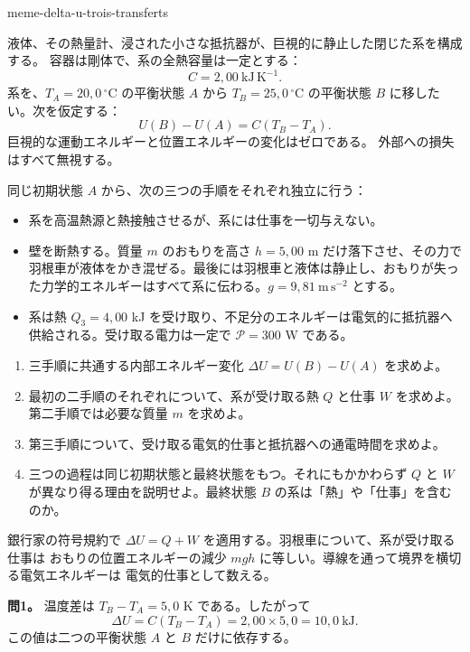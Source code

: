 \begin{exo}{meme-delta-u-trois-transferts}

液体、その熱量計、浸された小さな抵抗器が、巨視的に静止した閉じた系を構成する。
容器は剛体で、系の全熱容量は一定とする：
\[
C=2{,}00\ \mathrm{kJ\,K^{-1}}.
\]
系を、$T_A=20{,}0\,^\circ\mathrm{C}$ の平衡状態 $A$ から
$T_B=25{,}0\,^\circ\mathrm{C}$ の平衡状態 $B$ に移したい。次を仮定する：
\[
U(B)-U(A)=C(T_B-T_A).
\]
巨視的な運動エネルギーと位置エネルギーの変化はゼロである。
外部への損失はすべて無視する。

同じ初期状態 $A$ から、次の三つの手順をそれぞれ独立に行う：
\begin{itemize}
\item[手順1] 系を高温熱源と熱接触させるが、系には仕事を一切与えない。
\item[手順2] 壁を断熱する。質量 $m$ のおもりを高さ $h=5{,}00$ m だけ落下させ、その力で羽根車が液体をかき混ぜる。最後には羽根車と液体は静止し、おもりが失った力学的エネルギーはすべて系に伝わる。$g=9{,}81\ \mathrm{m\,s^{-2}}$ とする。
\item[手順3] 系は熱 $Q_3=4{,}00$ kJ を受け取り、不足分のエネルギーは電気的に抵抗器へ供給される。受け取る電力は一定で $\mathcal P=300$ W である。
\end{itemize}

\begin{enumerate}
\item 三手順に共通する内部エネルギー変化 $\Delta U=U(B)-U(A)$ を求めよ。
\item 最初の二手順のそれぞれについて、系が受け取る熱 $Q$ と仕事 $W$ を求めよ。第二手順では必要な質量 $m$ を求めよ。
\item 第三手順について、受け取る電気的仕事と抵抗器への通電時間を求めよ。
\item 三つの過程は同じ初期状態と最終状態をもつ。それにもかかわらず $Q$ と $W$ が異なり得る理由を説明せよ。最終状態 $B$ の系は「熱」や「仕事」を含むのか。
\end{enumerate}

\begin{indication}
銀行家の符号規約で $\Delta U=Q+W$ を適用する。羽根車について、系が受け取る仕事は
おもりの位置エネルギーの減少 $mgh$ に等しい。導線を通って境界を横切る電気エネルギーは
電気的仕事として数える。
\end{indication}

\begin{solution}
\textbf{問1。} 温度差は $T_B-T_A=5{,}0$ K である。したがって
\[
\Delta U=C(T_B-T_A)
=2{,}00\times5{,}0
=10{,}0\ \mathrm{kJ}.
\]
この値は二つの平衡状態 $A$ と $B$ だけに依存する。


\end{solution}
\end{exo}
